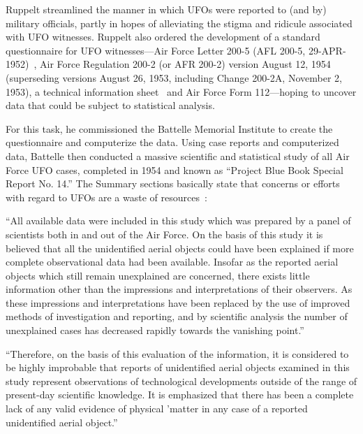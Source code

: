 Ruppelt streamlined the manner in which UFOs were reported to (and by) military officials, partly in hopes of alleviating the stigma and ridicule associated with UFO witnesses.
Ruppelt also ordered the development of a standard questionnaire for UFO witnesses---Air
Force Letter 200-5 (AFL 200-5, 29-APR-1952)~\cite{AFL200-5},
Air Force Regulation 200-2 (or AFR 200-2) version August 12, 1954~\cite{AFR200-2} (superseding versions August 26, 1953, including Change 200-2A, November 2, 1953),
a technical information sheet~\cite[Appendix~II]{PBB-SR8-1952}
and Air Force Form 112---hoping to uncover data that could be subject to statistical analysis.

For this task, he commissioned the Battelle Memorial Institute to create the questionnaire and computerize the data. Using case reports and computerized data, Battelle then conducted a massive scientific and statistical study of all Air Force UFO cases, completed in 1954 and known as ``Project Blue Book Special Report No. 14.'' The Summary sections basically state that concerns or efforts with regard to UFOs are a waste of resources~\cite[p.~ix]{ATIC1955May-SR14}:
\begin{svgraybox}
``All available data were included in this study which was prepared by
a panel of scientists both in and out of the Air Force. On the basis of this
study it is believed that all the unidentified aerial objects could have been
explained if more complete observational data had been available. Insofar
as the reported aerial objects which still remain unexplained are concerned,
there exists little information other than the impressions and interpretations
of their observers. As these impressions and interpretations have been
replaced by the use of improved methods of investigation and reporting,
and by scientific analysis the number of unexplained cases has decreased rapidly
towards the vanishing point.''

``Therefore, on the basis of this evaluation of the information, it is
considered to be highly improbable that reports of unidentified aerial objects
examined in this study represent observations of technological developments
outside of the range of present-day scientific knowledge. It is emphasized
that there has been a complete lack of any valid evidence of physical 'matter
in any case of a reported unidentified aerial object.''
\end{svgraybox}


